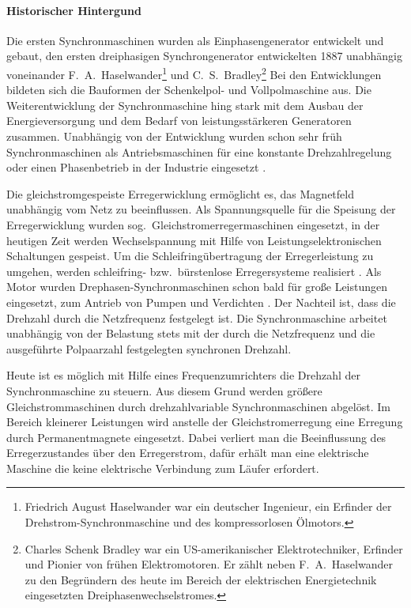 \paragraph{Historischer Hintergund} Die ersten Synchronmaschinen wurden als Einphasengenerator entwickelt und gebaut, den ersten dreiphasigen Synchrongenerator entwickelten 1887 unabhängig voneinander F.~A.~Haselwander\footnote{Friedrich August Haselwander war ein deutscher Ingenieur, ein Erfinder der Drehstrom-Synchronmaschine und des kompressorlosen Ölmotors.} und C.~S.~Bradley\footnote{Charles Schenk Bradley war ein US-amerikanischer Elektrotechniker, Erfinder und Pionier von frühen Elektromotoren. Er zählt neben F.~A.~Haselwander zu den Begründern des heute im Bereich der elektrischen Energietechnik eingesetzten Dreiphasenwechselstromes.} Bei den Entwicklungen bildeten sich die Bauformen der Schenkelpol- und Vollpolmaschine aus. Die Weiterentwicklung der Synchronmaschine hing stark mit dem Ausbau der Energieversorgung und dem Bedarf von leistungsstärkeren Generatoren zusammen. Unabhängig von der Entwicklung wurden schon sehr früh Synchronmaschinen als Antriebsmaschinen für eine konstante Drehzahlregelung oder einen Phasenbetrieb in der Industrie eingesetzt \autocites[S.~108f.]{ternes2012}[S.~287]{fischer2009}[S.~485f.]{mullerI2005}.

Die gleichstromgespeiste Erregerwicklung ermöglicht es, das Magnetfeld unabhängig vom Netz zu beeinflussen.
Als Spannungsquelle für die Speisung der Erregerwicklung wurden sog.\ Gleichstromerregermaschinen eingesetzt, in der heutigen Zeit werden Wechselspannung mit Hilfe von Leistungselektronischen Schaltungen gespeist.
Um die Schleifringübertragung der Erregerleistung zu umgehen, werden schleifring- bzw.\ bürstenlose Erregersysteme realisiert \autocite[S.~108]{ternes2012}.
Als Motor wurden Drephasen-Synchronmaschinen schon bald für große Leistungen eingesetzt, \zB zum Antrieb von Pumpen und Verdichten \autocite[S.~486]{mullerI2005}.
Der Nachteil ist, dass die Drehzahl durch die Netzfrequenz festgelegt ist.
Die Synchronmaschine arbeitet unabhängig von der Belastung stets mit der durch die Netzfrequenz und die ausgeführte Polpaarzahl festgelegten synchronen Drehzahl.

Heute ist es möglich mit Hilfe eines Frequenzumrichters die Drehzahl der Synchronmaschine zu steuern.
Aus diesem Grund werden größere Gleichstrommaschinen durch drehzahlvariable Synchronmaschinen abgelöst.
Im Bereich kleinerer Leistungen wird anstelle der Gleichstromerregung eine Erregung durch Permanentmagnete eingesetzt.
Dabei verliert man die Beeinflussung des Erregerzustandes über den Erregerstrom, dafür erhält man eine elektrische Maschine die keine elektrische Verbindung zum Läufer erfordert.


